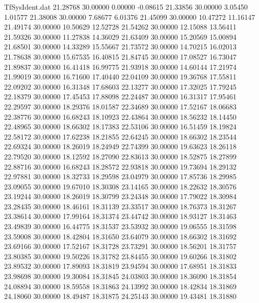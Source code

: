 \begin{filecontents}{TfSysIdent.dat}
  21.28768   30.00000    0.00000   -0.08615
  21.33856   30.00000    3.05450    1.01577
  21.38008   30.00000    7.68677    6.01376
  21.45099   30.00000   10.47272   11.16147
  21.49174   30.00000   10.50629   12.52728
  21.54262   30.00000   12.15088   13.56411
  21.59326   30.00000   11.27838   14.36029
  21.63409   30.00000   15.20569   15.00894
  21.68501   30.00000   14.33289   15.55667
  21.73572   30.00000   14.70215   16.02013
  21.78638   30.00000   15.67535   16.40815
  21.84745   30.00000   17.08527   16.73047
  21.89837   30.00000   16.41418   16.99775
  21.93918   30.00000   14.60144   17.21974
  21.99019   30.00000   16.71600   17.40440
  22.04109   30.00000   19.36768   17.55811
  22.09202   30.00000   16.31348   17.68603
  22.13277   30.00000   17.32025   17.79245
  22.18379   30.00000   17.45453   17.88098
  22.24487   30.00000   16.31317   17.95461
  22.29597   30.00000   18.29376   18.01587
  22.34689   30.00000   17.52167   18.06683
  22.38776   30.00000   16.68243   18.10923
  22.43864   30.00000   18.56232   18.14450
  22.48965   30.00000   18.66302   18.17383
  22.53106   30.00000   16.51459   18.19824
  22.58172   30.00000   17.62238   18.21855
  22.64245   30.00000   18.66302   18.23544
  22.69324   30.00000   18.26019   18.24949
  22.74399   30.00000   19.63623   18.26118
  22.79520   30.00000   18.12592   18.27090
  22.83613   30.00000   18.52875   18.27899
  22.88716   30.00000   16.68243   18.28572
  22.93818   30.00000   19.73694   18.29132
  22.97881   30.00000   18.32733   18.29598
  23.04979   30.00000   17.85736   18.29985
  23.09055   30.00000   19.67010   18.30308
  23.14165   30.00000   18.22632   18.30576
  23.19244   30.00000   18.26019   18.30799
  23.24348   30.00000   17.79022   18.30984
  23.28435   30.00000   18.46161   18.31139
  23.33517   30.00000   18.76373   18.31267
  23.38614   30.00000   17.99164   18.31374
  23.44742   30.00000   18.93127   18.31463
  23.49839   30.00000   16.44775   18.31537
  23.53932   30.00000   19.06555   18.31598
  23.59008   30.00000   18.42804   18.31650
  23.64079   30.00000   18.66302   18.31692
  23.69166   30.00000   17.52167   18.31728
  23.73291   30.00000   18.56201   18.31757
  23.80385   30.00000   19.50226   18.31782
  23.84455   30.00000   19.60266   18.31802
  23.89532   30.00000   17.89093   18.31819
  23.94594   30.00000   17.68951   18.31833
  23.98698   30.00000   19.30084   18.31845
  24.03803   30.00000   18.36090   18.31854
  24.08894   30.00000   18.59558   18.31863
  24.13992   30.00000   18.42834   18.31869
  24.18060   30.00000   18.49487   18.31875
  24.25143   30.00000   19.43481   18.31880

\end{filecontents}
